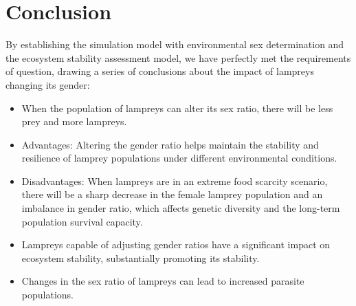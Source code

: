 \documentclass{mcmthesis}
\begin{document}
\section{Conclusion}

By establishing the simulation model with environmental sex determination and the ecosystem stability assessment model, we have perfectly met the requirements of question, drawing a series of conclusions about the impact of lampreys changing its gender:
\begin{itemize}
    \item When the population of lampreys can alter its sex ratio, there will be less prey and more lampreys.

    \item Advantages: Altering the gender ratio helps maintain the stability and resilience of lamprey populations under different environmental conditions.

    \item Disadvantages: When lampreys are in an extreme food scarcity scenario, there will be  a sharp decrease in the female lamprey population and an imbalance in gender ratio, which affects genetic diversity and the long-term population survival capacity.

    \item Lampreys capable of adjusting gender ratios have a significant impact on ecosystem stability, substantially promoting its stability.

    \item Changes in the sex ratio of lampreys can lead to increased parasite populations.
\end{itemize}
\end{document}
